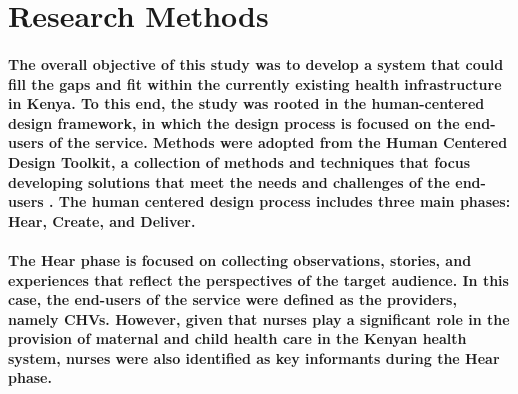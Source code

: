 \section{Research Methods}
\paragraph{The overall objective of this study was to develop a system that could fill the gaps and fit within the currently existing health infrastructure in Kenya. To this end, the study was rooted in the human-centered design framework, in which the design process is focused on the end-users of the service. Methods were adopted from the Human Centered Design Toolkit, a collection of methods and techniques that focus developing solutions that meet the needs and challenges of the end-users \citep{HCDToolkit}.  The human centered design process includes three main phases: Hear, Create, and Deliver.} 

\paragraph{The Hear phase is focused on collecting observations, stories, and experiences that reflect the perspectives of the target audience. In this case, the end-users of the service were defined as the providers, namely CHVs. However, given that nurses play a significant role in the provision of maternal and child health care in the Kenyan health system, nurses were also identified as key informants during the Hear phase.}




































